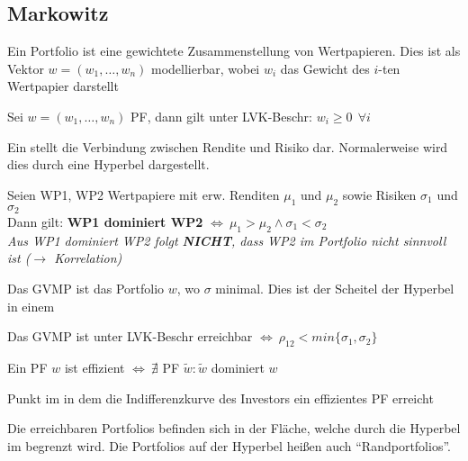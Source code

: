 \subsection{Markowitz}
 \begin{defi}[Portfolio]
	Ein Portfolio ist eine gewichtete Zusammenstellung von Wertpapieren. Dies ist als Vektor $w = (w_1, \dots, w_n)$ modellierbar, wobei $w_i$ das Gewicht des $i$-ten Wertpapier darstellt
\end{defi}
\begin{defi}[Leerverkaufsbeschränkung]
	Sei $w = (w_1, \dots, w_n)$ PF, dann gilt unter LVK-Beschr: $w_i \geq 0 ~ ~ \forall i$
\end{defi}
\begin{defi}[\msd]
	Ein \msd stellt die Verbindung zwischen Rendite und Risiko dar. Normalerweise wird dies durch eine Hyperbel dargestellt.
\end{defi}
\begin{defi}[Dominanz]
	Seien WP1, WP2 Wertpapiere mit erw. Renditen $\mu_1$ und $\mu_2$ sowie Risiken $\sigma_1$ und $\sigma_2$\\
	Dann gilt: \textbf{WP1 dominiert WP2} $\Longleftrightarrow ~ \mu_1 > \mu_2 \wedge \sigma_1 < \sigma_2$\\
	\emph{Aus WP1 dominiert WP2 folgt \textbf{NICHT}, dass WP2 im Portfolio nicht sinnvoll ist ($\rightarrow$ Korrelation)}
\end{defi}
\begin{defi}[GVMP]
	Das GVMP ist das Portfolio $w$, wo $\sigma$ minimal. Dies ist der Scheitel der Hyperbel in einem \msd 
\end{defi}
\begin{ann}
	Das GVMP ist unter LVK-Beschr erreichbar $\Longleftrightarrow ~ \rho_{12} < min \{\sigma_1, \sigma_2\}$
\end{ann}
\begin{defi}
	Ein PF $w$ ist effizient $\Longleftrightarrow ~ \nexists$ PF $\tilde{w}: \tilde{w}$ dominiert $w$
\end{defi}
\begin{defi}
	Punkt im \msd in dem die Indifferenzkurve des Investors ein effizientes PF erreicht
\end{defi}
\begin{defi}
	Die erreichbaren Portfolios befinden sich in der Fläche, welche durch die Hyperbel im \msd begrenzt wird.
	Die Portfolios auf der Hyperbel heißen auch ``Randportfolios''.
\end{defi}

